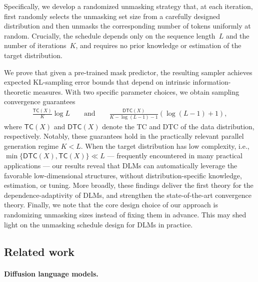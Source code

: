 \documentclass[english]{article}
\newcommand{\data}{\mathsf{data}}
\newcommand{\veps}{\varepsilon}
\newcommand{\TC}{\mathsf{TC}}
\newcommand{\DTC}{\mathsf{DTC}}
\newcommand{\train}{\mathsf{pred}}
\begin{document}
Specifically, we develop a randomized unmasking strategy that, at each iteration, first randomly selects the unmasking set size from a carefully designed distribution and then unmasks the corresponding number of tokens uniformly at random. 
Crucially, the schedule depends only on the  sequence length~$L$ and the number of iterations~$K$, and requires no prior knowledge or estimation of the target distribution.

We prove that given a pre-trained mask predictor, the resulting sampler achieves expected KL-sampling error bounds that depend on intrinsic information-theoretic measures. With two specific parameter choices, we obtain sampling convergence guarantees
\begin{align*}
\frac{\TC(X)}{K}\log L \qquad\text{and}\qquad  \frac{\DTC(X)}{K - \log (L-1)-1}(\log (L-1)+1),
\end{align*}
where $\TC(X)$ and $\DTC(X)$ denote the TC and DTC of the data distribution, respectively.
Notably, these guarantees hold in the practically relevant parallel generation regime $K<L$.
When the target distribution has low complexity, i.e., $\min\{\DTC(X), \TC(X)\} \ll L$ --- frequently encountered in many practical applications --- our results reveal that DLMs can automatically leverage the favorable low-dimensional structures, without distribution-specific knowledge, estimation, or tuning.
More broadly, these findings deliver the first theory for the dependence-adaptivity of DLMs, and strengthen the state-of-the-art convergence theory.  
%
Finally, we note that the core design choice of our approach is randomizing unmasking sizes instead of fixing them in advance.
%
This may shed light on the unmasking schedule design for DLMs in practice.




\subsection{Related work}
\label{sec:related-work}

\paragraph{Diffusion language models.}
\end{document}
